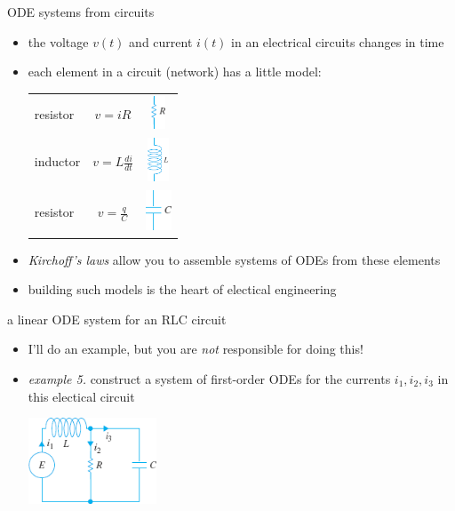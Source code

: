 \documentclass[dvipsnames,colorlinks]{beamer}
\begin{document}
\begin{frame}{ODE systems from circuits}

\begin{itemize}
\item the voltage $v(t)$ and current $i(t)$ in an electrical circuits changes in time
\item each element in a circuit (network) has a little model:

\begin{tabular}{lcc}
resistor & $v = iR$ & \includegraphics[height=10mm,trim=0 3mm 0 -3mm]{figs/circuit-element-R} \\
inductor & $v = L \frac{di}{dt}$ & \includegraphics[height=13mm,trim=0 5mm 0 -5mm]{figs/circuit-element-L} \\
resistor & $v = \frac{q}{C}$ & \includegraphics[height=12mm,trim=0 5mm 0 -5mm]{figs/circuit-element-C}
\end{tabular}

\bigskip \bigskip
\item \emph{Kirchoff's laws} allow you to assemble systems of ODEs from these elements
\item building such models is the heart of electical engineering
\end{itemize}
\end{frame}


\begin{frame}{a linear ODE system for an RLC circuit}

\begin{itemize}
\item I'll do an example, but you are \emph{not} responsible for doing this!
\item \emph{example 5.} construct a system of first-order ODEs for the currents $i_1,i_2,i_3$ in this electical circuit

\bigskip
\includegraphics[width=0.3\textwidth]{figs/new-rlc-circuit}
\end{itemize}

\vspace{30mm}
\end{frame}
\end{document}
